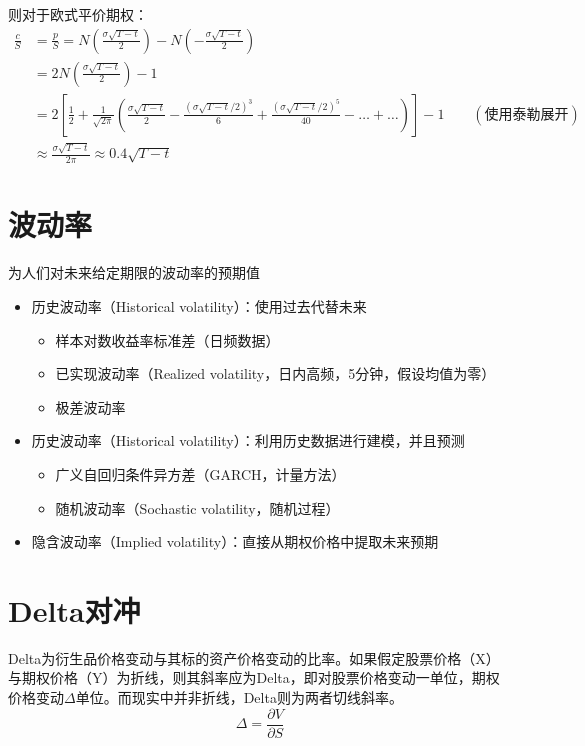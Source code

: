 \documentclass[11pt]{article}
\begin{document}
则对于欧式平价期权：
\begin{align*}
    \frac{c}{S} & = \frac{p}{S} = N \left( \frac{\sigma\sqrt{T-t}}{2} \right) - N\left( -\frac{\sigma\sqrt{T-t}}{2} \right) \\
    & = 2N\left( \frac{\sigma\sqrt{T-t}}{2} \right) - 1 \\
    & = 2\left[\frac{1}{2} + \frac{1}{\sqrt{2\pi}} \left(\frac{\sigma\sqrt{T-t}}{2} - \frac{(\sigma\sqrt{T-t}/2)^3}{6} + \frac{(\sigma\sqrt{T-t}/2)^5}{40} - \dots + \dots\right) \right] - 1 \qquad (\text{使用泰勒展开}) \\
    & \approx \frac{\sigma\sqrt{T-t}}{2\pi} \approx 0.4\sqrt{T-t}
\end{align*}

\section{波动率}

为人们对未来给定期限的波动率的预期值
\begin{itemize}
    \item 历史波动率（Historical volatility）：使用过去代替未来
          \begin{itemize}
              \item 样本对数收益率标准差（日频数据）
              \item 已实现波动率（Realized volatility，日内高频，5分钟，假设均值为零）
              \item 极差波动率
          \end{itemize}
    \item 历史波动率（Historical volatility）：利用历史数据进行建模，并且预测
          \begin{itemize}
              \item 广义自回归条件异方差（GARCH，计量方法）
              \item 随机波动率（Sochastic volatility，随机过程）
          \end{itemize}
    \item 隐含波动率（Implied volatility）：直接从期权价格中提取未来预期
\end{itemize}

\section{Delta对冲}

Delta为衍生品价格变动与其标的资产价格变动的比率。如果假定股票价格（X）与期权价格（Y）为折线，则其斜率应为Delta，即对股票价格变动一单位，期权价格变动$\Delta$单位。而现实中并非折线，Delta则为两者切线斜率。
\begin{equation*}
    \Delta = \frac{\partial V}{\partial S}
\end{equation*}
\end{document}
